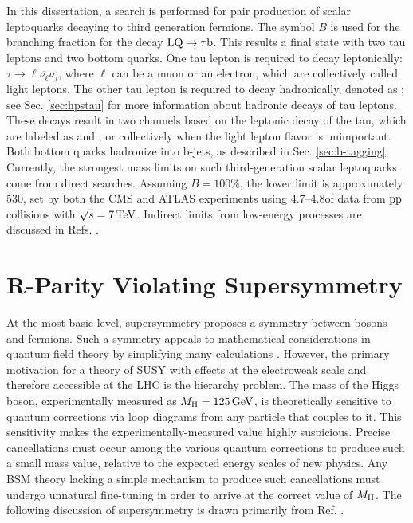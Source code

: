 In this dissertation, a search is performed for pair production of scalar leptoquarks decaying to third generation fermions. The symbol $B$ is used for the branching fraction for the decay $\text{LQ} \rightarrow \tau \mathrm{b}$. This results a final state with two tau leptons and two bottom quarks. One tau lepton is required to decay leptonically: $\tau \rightarrow \ell \overline{\nu_{\ell}} \nu_{\tau}$, where $\ell$ can be a muon or an electron, which are collectively called light leptons. The other tau lepton is required to decay hadronically, denoted as \tauh; see Sec. \ref{sec:hpstau} for more information about hadronic decays of tau leptons. These decays result in two channels based on the leptonic decay of the tau, which are labeled as \etau and \mutau, or collectively \ltau when the light lepton flavor is unimportant. Both bottom quarks hadronize into b-jets, as described in Sec. \ref{sec:b-tagging}. Currently, the strongest mass limits on such third-generation scalar leptoquarks come from direct searches. Assuming $B=100\%$, the lower limit is approximately 530\GeV, set by both the CMS \cite{CMSLQ3} and ATLAS \cite{ATLASLQ3} experiments using 4.7--4.8\fbinv of data from $\mathrm{p}\mathrm{p}$ collisions with $\sqrt{s}=7\,\text{Te\hspace{-.08em}V}$. Indirect limits from low-energy processes are discussed in Refs. \cite{ModelIndLQ,Leurer:1993em, MuchAdo, LQreview}.


\section{R-Parity Violating Supersymmetry
\label{sec:RPVSUSY}}

At the most basic level, supersymmetry proposes a symmetry between bosons and fermions. Such a symmetry appeals to mathematical considerations in quantum field theory by simplifying many calculations \cite{Peskin}. However, the primary motivation for a theory of SUSY with effects at the electroweak scale and therefore accessible at the LHC is the hierarchy problem. The mass of the Higgs boson, experimentally measured as $M_{\mathrm{H}} = 125\,\text{Ge\hspace{-.08em}V}$, is theoretically sensitive to quantum corrections via loop diagrams from any particle that couples to it. This sensitivity makes the experimentally-measured value highly suspicious. Precise cancellations must occur among the various quantum corrections to produce such a small mass value, relative to the expected energy scales of new physics. Any BSM theory lacking a simple mechanism to produce such cancellations must undergo unnatural fine-tuning in order to arrive at the correct value of $M_{\mathrm{H}}$. The following discussion of supersymmetry is drawn primarily from Ref. \cite{Primer}.

